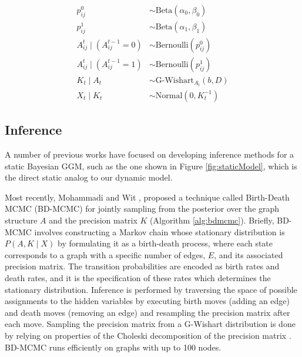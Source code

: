 \documentclass{article}
\begin{document}
\begin{align*}
p_{ij}^0 &\sim \text{Beta}(\alpha_0,\beta_0) \\
p_{ij}^1 &\sim \text{Beta}(\alpha_1,\beta_1) \\
A_{ij}^t \mid (A_{ij}^{t-1} = 0) &\sim \text{Bernoulli}(p_{ij}^0) \\
A_{ij}^t \mid (A_{ij}^{t-1} = 1) &\sim \text{Bernoulli}(p_{ij}^1) \\
K_t \mid A_t &\sim \text{G-Wishart}_{A_t}(b,D) \\ 
X_t \mid K_t &\sim \text{Normal}(0,K_t^{-1})
\end{align*}


\subsection{Inference}
\label{sec:inference}
A number of previous works have focused on developing inference methods for a static Bayesian GGM, such as the one shown in Figure \ref{fig:staticModel}, which is the direct static analog to our dynamic model.

Most recently, Mohammadi and Wit \cite{mohammadi2012efficient}, proposed a technique called Birth-Death MCMC (BD-MCMC) for jointly sampling from the posterior over the graph structure $A$ and the precision matrix $K$ (Algorithm \ref{alg:bdmcmc}). Briefly, BD-MCMC involves constructing a Markov chain whose stationary distribution is $P(A,K \mid X)$ by formulating it as a birth-death process, where each state corresponds to a graph with a specific number of edges, $E$, and its associated precision matrix. The transition probabilities are encoded as birth rates and death rates, and it is the specification of these rates which determines the stationary distribution. Inference is performed by traversing the space of possible assignments to the hidden variables by executing birth moves (adding an edge) and death moves (removing an edge) and resampling the precision matrix after each move. Sampling the precision matrix from a G-Wishart distribution is done by relying on properties of the Choleski decomposition of the precision matrix \cite{mohammadi2012efficient}. BD-MCMC runs efficiently on graphs with up to 100 nodes.
\end{document}
